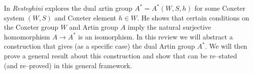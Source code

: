 In \cite{resteghini_free_2024} \emph{Resteghini} explores the dual artin group $A^* = A^*(W,S,h)$ for some Coxeter system $(W,S)$ and Coxeter element $h \in W$.
He shows that certain conditions on the Coxeter group $W$ and Artin group $A$ imply the natural surjective homomorphism $A \to A^*$ is an isomorphism.
In this review we will abstract a construction that gives (as a specific case) the dual Artin group $A^*$.
We will then prove a general result about this construction and show that \cite[Proposition 3.9]{resteghini_free_2024} can be re--stated (and re--proved) in this general framework.

